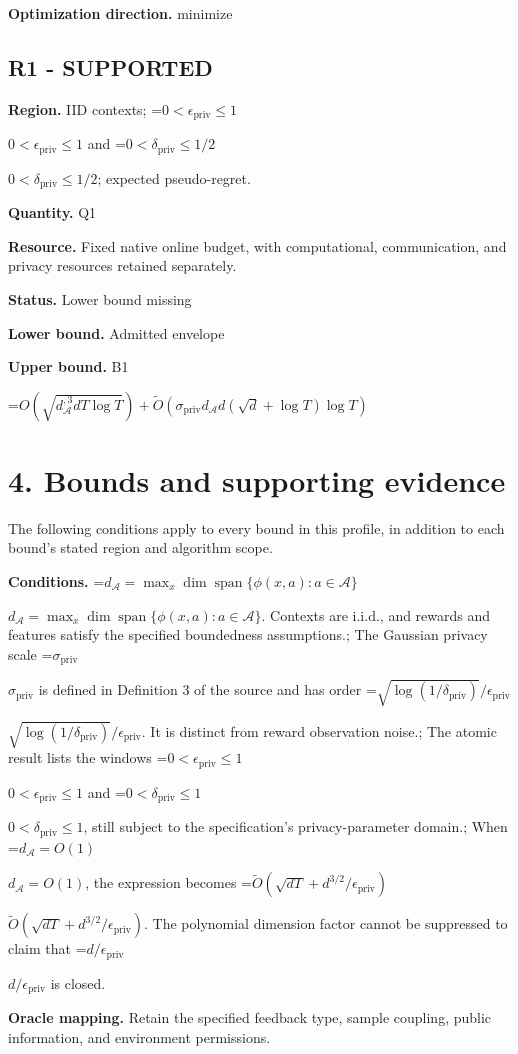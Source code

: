 \documentclass[10pt,a4paper]{article}
\newcommand{\AtlasMath}[1]{\par\begingroup\centering\setbox0=\hbox{$\displaystyle #1$}\ifdim\wd0>1.4\linewidth\typeout{ATLAS WIDE FORMULA: \the\wd0}\fi\ifdim\wd0>\linewidth\resizebox{\linewidth}{!}{\box0}\else\box0\fi\par\endgroup}
\newcommand{\AtlasInlineMath}[1]{\begingroup\setbox0=\hbox{$#1$}\ifdim\wd0>.4\linewidth\endgroup\AtlasMath{#1}\else\endgroup$#1$\fi}
\begin{document}
\textbf{Optimization direction.} minimize

\subsection{R1 - SUPPORTED}
\textbf{Region.} IID contexts; \AtlasInlineMath{0<\epsilon_{\mathrm{priv}}\le1} and \AtlasInlineMath{0<\delta_{\mathrm{priv}}\le1/2}; expected pseudo-regret.

\textbf{Quantity.} Q1

\textbf{Resource.} Fixed native online budget, with computational, communication, and privacy resources retained separately.

\textbf{Status.} Lower bound missing

\textbf{Lower bound.} Admitted envelope

\textbf{Upper bound.} B1

\AtlasMath{O\!\left(\sqrt{d_{\mathcal{A}}^{,3}dT\log T}\right)+\widetilde{O}\!\left(\sigma_{\mathrm{priv}}d_{\mathcal{A}}d(\sqrt d+\log T)\log T\right)}
\section{4. Bounds and supporting evidence}
The following conditions apply to every bound in this profile, in addition to each bound's stated region and algorithm scope.

\textbf{Conditions.} \AtlasInlineMath{d_{\mathcal A}=\max_x\dim\operatorname{span}\{\phi(x,a):a\in\mathcal A\}}. Contexts are i.i.d., and rewards and features satisfy the specified boundedness assumptions.; The Gaussian privacy scale \AtlasInlineMath{\sigma_{\mathrm{priv}}} is defined in Definition 3 of the source and has order \AtlasInlineMath{\sqrt{\log(1/\delta_{\mathrm{priv}})}/\epsilon_{\mathrm{priv}}}. It is distinct from reward observation noise.; The atomic result lists the windows \AtlasInlineMath{0<\epsilon_{\mathrm{priv}}\le1} and \AtlasInlineMath{0<\delta_{\mathrm{priv}}\le1}, still subject to the specification's privacy-parameter domain.; When \AtlasInlineMath{d_{\mathcal A}=O(1)}, the expression becomes \AtlasInlineMath{\widetilde O(\sqrt{dT}+d^{3/2}/\epsilon_{\mathrm{priv}})}. The polynomial dimension factor cannot be suppressed to claim that \AtlasInlineMath{d/\epsilon_{\mathrm{priv}}} is closed.

\textbf{Oracle mapping.} Retain the specified feedback type, sample coupling, public information, and environment permissions.
\end{document}
